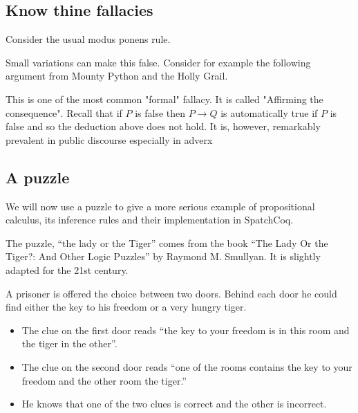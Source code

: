 \subsection{Know thine fallacies}

Consider the usual modus ponens rule. 

Small variations can make this false.
 Consider for example the following argument from Mounty Python and the Holly Grail.
 
 
 
 
 
 
 This is one of the most common "formal" fallacy. It is called "Affirming the consequence". Recall that if $P$ is false then $P\rightarrow Q$ is automatically true if $P$ is false and so the deduction above does not hold. It is, however, remarkably prevalent in public discourse especially in adverx

\subsection{A puzzle}

We will now use a puzzle to give a more serious example	 of propositional calculus, its inference rules and their implementation in SpatchCoq. 

The puzzle, ``the lady or the Tiger'' comes from the book  ``The Lady Or the Tiger?: And Other Logic Puzzles'' by Raymond M. Smullyan. It is slightly adapted for the 21st century.

A  prisoner is offered the choice between two doors. Behind each door he could find either the key to his freedom or a very hungry tiger.

 \begin{itemize}

 \item The clue on the first door reads ``the key to your freedom  is in this room and the tiger in the other''.
 \item The clue on the second door reads ``one of the rooms contains  the key to your freedom and the other room the tiger.''
  \item He knows that one of the two clues is correct and the other is incorrect.
 \end{itemize}

